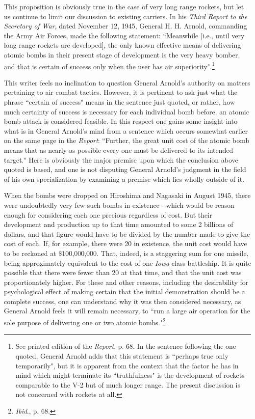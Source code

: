 This proposition is obviously true in the case of very long range rockets, but let us continue to limit our discussion to existing carriers. In his \textit{Third Report to the Secretary of War}, dated November 12, 1945, General H. H. Arnold, commanding the Army Air Forces, made the following statement: ``Meanwhile [i.e., until very long range rockets are developed], the only known effective means of delivering atomic bombs in their present stage of development is the very heavy bomber, and that is certain of success only when the user has air superiority".\footnote{See printed edition of the \textit{Report}, p. 68. In the sentence following the one quoted, General Arnold adds that this statement is ``perhaps true only temporarily", but it is apparent from the context that the factor he has in mind which might terminate its ``truthfulness" is the development of rockets comparable to the V-2 but of much longer range. The present discussion is not concerned with rockets at all.}

This writer feels no inclination to question General Arnold's authority on matters pertaining to air combat tactics. However, it is pertinent to ask just what the phrase ``certain of success" means in the sentence just quoted, or rather, how much certainty of success is necessary for each individual bomb before. an atomic bomb attack is considered feasible. In this respect one gains some insight into what is in General Arnold's mind from a sentence which occurs somewhat earlier on the same page in the \textit{Report}: ``Further, the great unit cost of the atomic bomb means that as nearly as possible every one must be delivered to its intended target." Here is obviously the major premise upon which the conclusion above quoted is based, and one is not disputing General Arnold's judgment in the field of his own specialization by examining a premise which lies wholly outside of it.

When the bombs were dropped on Hiroshima and Nagasaki in August 1945, there were undoubtedly very few such bombs in existence - which would be reason enough for considering each one precious regardless of cost. But their development and production up to that time amounted to some 2 billions of dollars, and that figure would have to be divided by the number made to give the cost of each. If, for example, there were 20 in existence, the unit cost would have to be reckoned at \$100,000,000. That, indeed, is a staggering sum for one missile, being approximately equivalent to the cost of one \emph{Iowa} class battleship. It is quite possible that there were fewer than 20 at that time, and that the unit cost was proportionately higher. For these and other reasons, including the desirability for psychological effect of making certain that the initial demonstration should be a complete success, one can understand why it was then considered necessary, as General Arnold feels it will remain necessary, to ``run a large air operation for the sole purpose of delivering one or two atomic bombs."\footnote{\emph{Ibid}., p. 68.}

